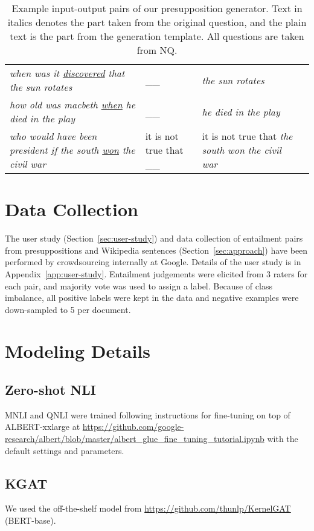 \documentclass[11pt,a4paper]{article}
\begin{document}
\begin{table*}[t]
{\begin{tabular}{llll}
    \textit{when was it \underline{discovered} that the sun rotates} & \_\_ & \textit{the sun rotates} \\
    \textit{how old was macbeth \underline{when} he died in the play} & \_\_ &  \textit{he died in the play} \\
    \textit{who would have been president \underline{if} the south \underline{won} the civil war} & it is not true that \_\_ & it is not true that \textit{the south won the civil war} \\
    \bottomrule
    \end{tabular}
    }
    \caption{Example input-output pairs of our presupposition generator. Text in italics denotes the part taken from the original question, and the plain text is the part from the generation template. All questions are taken from NQ.}
    \label{table:generator-examples-full}
\end{table*}

\section{Data Collection}
\label{app:data-collection}

The user study (Section~\ref{sec:user-study}) and data collection of entailment pairs from presuppositions and Wikipedia sentences (Section~\ref{sec:approach}) have been performed by crowdsourcing internally at Google. Details of the user study is in Appendix~\ref{app:user-study}. Entailment judgements were elicited from 3 raters for each pair, and majority vote was used to assign a label. Because of class imbalance, all positive labels were kept in the data and negative examples were down-sampled to 5 per document. 

\section{Modeling Details}

\subsection{Zero-shot NLI}
MNLI and QNLI were trained following instructions for fine-tuning on top of ALBERT-xxlarge at \url{https://github.com/google-research/albert/blob/master/albert_glue_fine_tuning_tutorial.ipynb} with the default settings and parameters. 

\subsection{KGAT}
We used the off-the-shelf model from \url{https://github.com/thunlp/KernelGAT} (BERT-base). 
    
\end{document}
